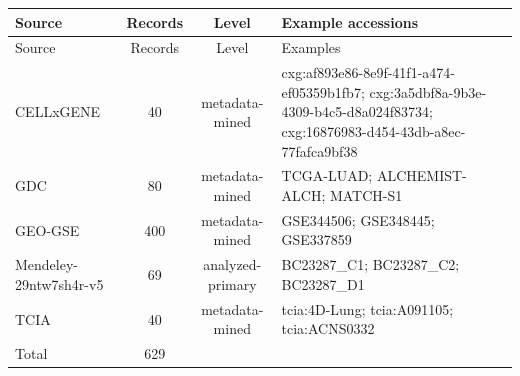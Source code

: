 \begin{longtable}{p{3.4cm}ccp{7.6cm}}\toprule
Source & Records & Level & Example accessions \\
\midrule
\endfirsthead
\toprule Source & Records & Level & Examples \\
\midrule \endhead
CELLxGENE & 40 & metadata-mined & cxg:af893e86-8e9f-41f1-a474-ef05359b1fb7; cxg:3a5dbf8a-9b3e-4309-b4c5-d8a024f83734; cxg:16876983-d454-43db-a8ec-77fafca9bf38 \\
GDC & 80 & metadata-mined & TCGA-LUAD; ALCHEMIST-ALCH; MATCH-S1 \\
GEO-GSE & 400 & metadata-mined & GSE344506; GSE348445; GSE337859 \\
Mendeley-29ntw7sh4r-v5 & 69 & analyzed-primary & BC23287\_C1; BC23287\_C2; BC23287\_D1 \\
TCIA & 40 & metadata-mined & tcia:4D-Lung; tcia:A091105; tcia:ACNS0332 \\
\midrule Total & 629 & & \\
\bottomrule
\end{longtable}
